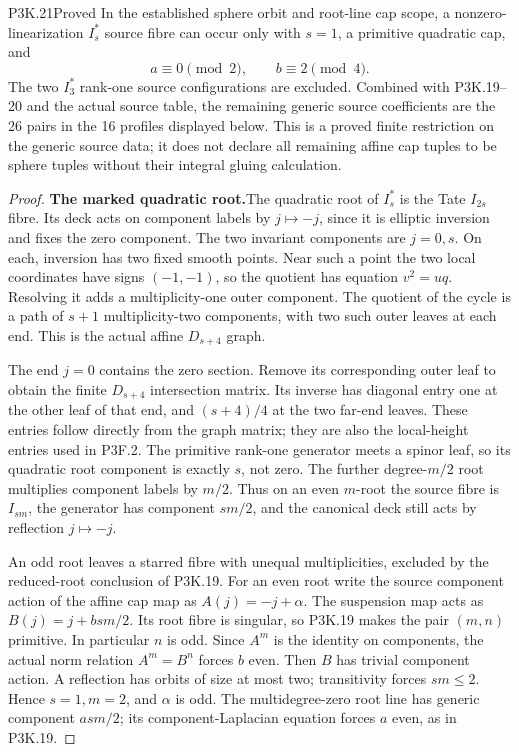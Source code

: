 \begin{statement}{P3K.21}{Proved}
In the established sphere orbit and root-line cap scope, a
nonzero-linearization \(I_s^*\) source fibre can occur only
with \(s=1\), a primitive quadratic cap, and
\[
                         a\equiv0\pmod2,
                         \qquad b\equiv2\pmod4.       \tag{P3K.21.1}
\]
The two \(I_3^*\) rank-one source configurations are excluded.
Combined with P3K.19–20 and the actual source table, the
remaining generic source coefficients are the 26 pairs in
the 16 profiles displayed below.  This is a proved finite
restriction on the generic source data; it does not declare
all remaining affine cap tuples to be sphere tuples without
their integral gluing calculation.
\end{statement}

\begin{proof}
\par\medskip\noindent\textbf{The marked quadratic root.}\enspace The quadratic root of
\(I_s^*\) is the Tate \(I_{2s}\) fibre.  Its deck
acts on component labels by \(j\mapsto-j\), since
it is elliptic inversion and fixes the zero component.
The two invariant components are \(j=0,s\).  On each,
inversion has two fixed smooth points.  Near such a point
the two local coordinates have signs \((-1,-1)\), so
the quotient has equation \(v^2=uq\).  Resolving it
adds a multiplicity-one outer component.  The quotient
of the cycle is a path of \(s+1\) multiplicity-two
components, with two such outer leaves at each end.
This is the actual affine \(D_{s+4}\) graph.

The end \(j=0\) contains the zero section.  Remove
its corresponding outer leaf to obtain the finite
\(D_{s+4}\) intersection matrix.  Its inverse has
diagonal entry one at the other leaf of that end, and
\((s+4)/4\) at the two far-end leaves.  These entries
follow directly from the graph matrix; they are also the
local-height entries used in P3F.2.  The primitive
rank-one generator meets a spinor leaf, so its quadratic
root component is exactly \(s\), not zero.
The further degree-\(m/2\) root multiplies component
labels by \(m/2\).  Thus on an even \(m\)-root
the source fibre is \(I_{sm}\), the generator has
component \(sm/2\), and the canonical deck still
acts by reflection \(j\mapsto-j\).

An odd root leaves a starred fibre with unequal
multiplicities, excluded by the reduced-root conclusion
of P3K.19.  For an even root write the source component
action of the affine cap map as
\(A(j)=-j+\alpha\).  The suspension map acts as
\(B(j)=j+bsm/2\).  Its root fibre is singular, so
P3K.19 makes the pair \((m,n)\) primitive.  In
particular \(n\) is odd.  Since \(A^m\) is the
identity on components, the actual norm relation
\(A^m=B^n\) forces \(b\) even.  Then \(B\)
has trivial component action.  A reflection has orbits
of size at most two; transitivity forces \(sm\le2\).
Hence \(s=1,m=2\), and \(\alpha\) is odd.
The multidegree-zero root line has generic component
\(asm/2\); its component-Laplacian equation forces
\(a\) even, as in P3K.19.


\end{proof}

